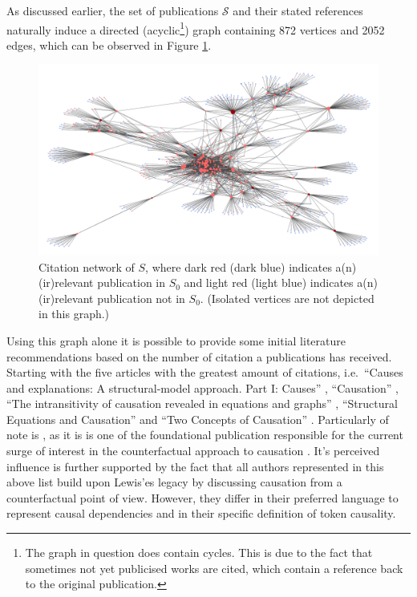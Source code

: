 \documentclass[11pt,a4paper]{book}
\theoremstyle{definition}
\theoremstyle{definition}
\theoremstyle{definition}
\theoremstyle{remark}
\newcommand{\tpset}{\mathcal{S}}
\newcommand{\pset}{S}
\newcommand{\psetz}{S_{\mathit{0}}}
\begin{document}
As discussed earlier, the set of publications $\tpset$ and their stated references naturally induce a directed (acyclic\footnote{The graph in question does contain cycles. This is due to the fact that sometimes not yet publicised works are cited, which contain a reference back to the original publication.}) graph containing 872 vertices and 2052 edges, which can be observed in Figure \ref{fig:pgraph-whole_graph}.


\begin{figure}[h]
\includegraphics[width=\textwidth]{whole_graph.png}
\caption{Citation network of $\pset$, where \textcolor{start_relevant}{dark red}  (\textcolor{start_nrelevant}{dark blue}) indicates a(n) (ir)relevant publication in $\psetz$ and \textcolor{other_relevant}{light red}  (\textcolor{other_nrelevant}{light blue}) indicates a(n) (ir)relevant publication not in $\psetz$. (Isolated vertices are not depicted in this graph.)}
\label{fig:pgraph-whole_graph}
\end{figure}

Using this graph alone it is possible to provide some initial literature recommendations based on the number of citation a publications has received. 
Starting with the five articles with the greatest amount of citations, i.e.\ 
``Causes and explanations: A structural-model approach. Part I: Causes'' \parencite{halpern2005causes}, 
``Causation'' \parencite{lewis1974causation},
``The intransitivity of causation revealed in equations and graphs'' \parencite{hitchcock2001intransitivity}, 
``Structural Equations and Causation'' \parencite{hall2007structural} and 
``Two Concepts of Causation'' \parencite{hall2004two}.
Particularly of note is \parencite{lewis1974causation}, as it is is one of the foundational publication responsible for the current surge of interest in the counterfactual approach to causation \parencite{beebee2009oxford}.
It's perceived influence is further supported by the fact that all authors represented in this above list build upon Lewis'es legacy by discussing causation from a counterfactual point of view. 
However, they differ in their preferred language to represent causal dependencies and in their specific definition of token causality. 
\end{document}
